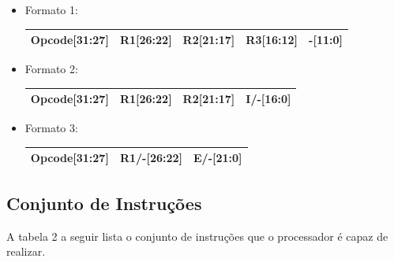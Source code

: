 \begin{itemize}

\item Formato 1:
\begin{tabular}{|c|c|c|c|c|}
\hline
Opcode[31:27] & R1[26:22] & R2[21:17] & R3[16:12] & -[11:0]\\
\hline
\end{tabular}


\item Formato 2:
\begin{tabular}{|c|c|c|c|}
\hline
Opcode[31:27] & R1[26:22] & R2[21:17] & I/-[16:0]\\
\hline
\end{tabular}

\item Formato 3:
\begin{tabular}{|c|c|c|}
\hline
Opcode[31:27] & R1/-[26:22] & E/-[21:0]\\
\hline
\end{tabular}

\end{itemize}

\subsection{Conjunto de Instruç\~oes}

A tabela 2 a seguir lista o conjunto de instruções que o processador é capaz de realizar.

